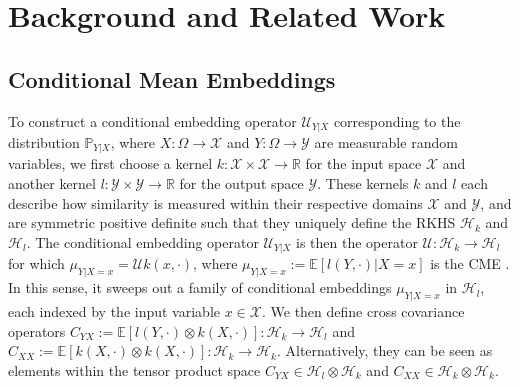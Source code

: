 \documentclass[twoside]{article}
\begin{document}
	
	\section{Background and Related Work}
	\label{sec:background}
	
		\subsection{Conditional Mean Embeddings}
			
			To construct a conditional embedding operator $\mathcal{U}_{Y | X}$ corresponding to the distribution $\mathbb{P}_{Y | X}$, where $X : \Omega \to \mathcal{X}$ and $Y: \Omega \to \mathcal{Y}$ are measurable random variables, we first choose a kernel $k : \mathcal{X} \times \mathcal{X} \to \mathbb{R}$ for the input space $\mathcal{X}$ and another kernel $l : \mathcal{Y} \times \mathcal{Y} \to \mathbb{R}$ for the output space $\mathcal{Y}$. These kernels $k$ and $l$ each describe how similarity is measured within their respective domains $\mathcal{X}$ and $\mathcal{Y}$, and are symmetric positive definite such that they uniquely define the \gls{RKHS} $\mathcal{H}_{k}$ and $\mathcal{H}_{l}$. The conditional embedding operator $\mathcal{U}_{Y | X}$ is then the operator $\mathcal{U} : \mathcal{H}_{k} \to \mathcal{H}_{l}$ for which $\mu_{Y | X = x} = \mathcal{U} k(x, \cdot)$, where $\mu_{Y | X = x} := \mathbb{E}[l(Y, \cdot) | X = x]$ is the \gls{CME} \citep{song2009hilbert}. In this sense, it sweeps out a family of conditional embeddings $\mu_{Y | X = x}$ in $\mathcal{H}_{l}$, each indexed by the input variable $x \in \mathcal{X}$. We then define cross covariance operators $C_{YX} := \mathbb{E}[l(Y, \cdot) \otimes k(X, \cdot)] : \mathcal{H}_{k} \to \mathcal{H}_{l}$ and $C_{XX} := \mathbb{E}[k(X, \cdot) \otimes k(X, \cdot)] : \mathcal{H}_{k} \to \mathcal{H}_{k}$. Alternatively, they can be seen as elements within the tensor product space $C_{YX} \in \mathcal{H}_{l} \otimes \mathcal{H}_{k}$ and $C_{XX} \in \mathcal{H}_{k} \otimes \mathcal{H}_{k}$.
			
\end{document}
